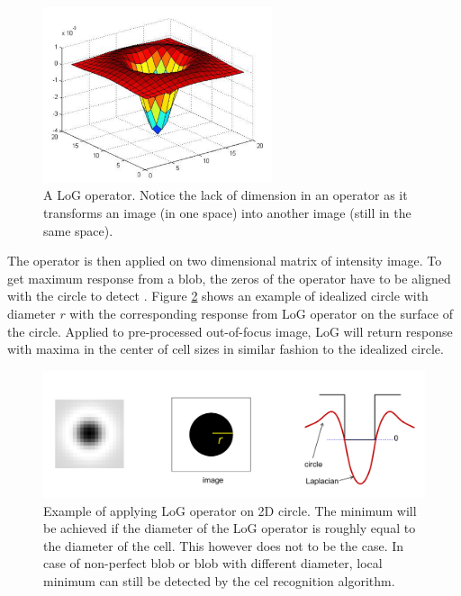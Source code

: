 \documentclass[pdftex,12pt,a4paper]{report}
\begin{document}
\begin{figure}[H]
\centering
\includegraphics[width=0.6\textwidth]{images/log_operator}
\caption{A LoG operator. Notice the lack of dimension in an operator as it transforms an image (in one space) into another image (still in the same space).}
\label{fig:log_operator}
\end{figure}

The operator is then applied on two dimensional matrix of intensity image. To get maximum response from a blob, the zeros of the operator have to be aligned with the circle to detect \cite{marr1980theory}. Figure \ref{fig:log_example} shows an example of idealized circle with diameter $r$ with the corresponding response from LoG operator on the surface of the circle. Applied to pre-processed out-of-focus image, LoG will return response with maxima in the center of cell sizes in similar fashion to the idealized circle.

\begin{figure}[H]
\centering
\includegraphics[width=\textwidth]{images/log_operator_example}
\caption{Example of applying LoG operator on 2D circle. The minimum will be achieved if the diameter of the LoG operator is roughly equal to the diameter of the cell. This however does not to be the case. In case of non-perfect blob or blob with different diameter, local minimum can still be detected by the cel recognition algorithm.}
\label{fig:log_example}
\end{figure}
\end{document}

